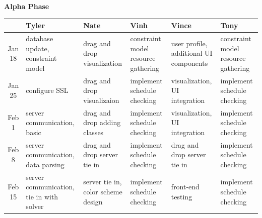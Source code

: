 \documentclass{extarticle}
\begin{document}
\begin{center}
\bf{Alpha Phase}
\begin{table}[H]
\begin{tabular}{ c || p{3cm} | p{3cm} | p{3cm} | p{3cm} | p{3cm} |}
 & \bf{Tyler} & \bf{Nate} & \bf{Vinh} & \bf{Vince} & \bf{Tony} \\ \hline

Jan 18 & database update, constraint model & drag and drop visualization & constraint model resource gathering & user profile, additional UI components & constraint model resource gathering \\ \hline

Jan 25 & configure SSL & drag and drop visualizaion & implement schedule checking & visualization, UI integration & implement schedule checking \\ \hline

Feb 1 & server communication, basic & drag and drop adding classes & implement schedule checking & visualization, UI integration & implement schedule checking \\ \hline

Feb 8 & server communication, data parsing & drag and drop server tie in & implement schedule checking & drag and drop server tie in & implement schedule checking \\ \hline

Feb 15 & server communication, tie in with solver & server tie in, color scheme design & implement schedule checking & front-end testing & implement schedule checking \\ \hline
\end{tabular}
\end{table}
\end{center}
\end{document}
